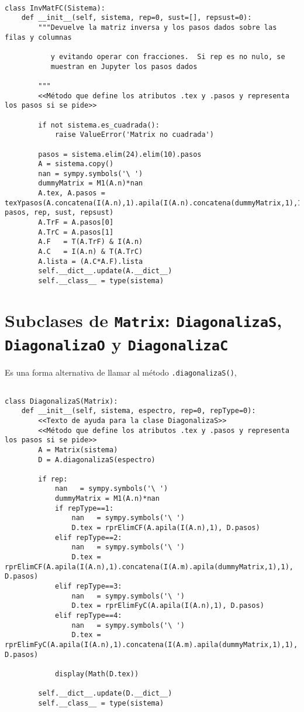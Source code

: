 \documentclass[11pt]{report}
\begin{document}
\begin{verbatim}

class InvMatFC(Sistema):
    def __init__(self, sistema, rep=0, sust=[], repsust=0):
        """Devuelve la matriz inversa y los pasos dados sobre las filas y columnas

           y evitando operar con fracciones.  Si rep es no nulo, se
           muestran en Jupyter los pasos dados

        """
        <<Método que define los atributos .tex y .pasos y representa los pasos si se pide>>

        if not sistema.es_cuadrada():
            raise ValueError('Matrix no cuadrada')
    
        pasos = sistema.elim(24).elim(10).pasos
        A = sistema.copy()
        nan = sympy.symbols('\ ')
        dummyMatrix = M1(A.n)*nan
        A.tex, A.pasos = texYpasos(A.concatena(I(A.n),1).apila(I(A.n).concatena(dummyMatrix,1),1), pasos, rep, sust, repsust)
        A.TrF = A.pasos[0]
        A.TrC = A.pasos[1]
        A.F   = T(A.TrF) & I(A.n)
        A.C   = I(A.n) & T(A.TrC)
        A.lista = (A.C*A.F).lista
        self.__dict__.update(A.__dict__)
        self.__class__ = type(sistema)

\end{verbatim}

\section{Subclases de \texttt{Matrix}: \texttt{DiagonalizaS}, \texttt{DiagonalizaO} y  \texttt{DiagonalizaC}}
\label{sec:orge4fca0e}
Es una forma alternativa de llamar al método \texttt{.diagonalizaS()},
\begin{verbatim}

class DiagonalizaS(Matrix):
    def __init__(self, sistema, espectro, rep=0, repType=0):
        <<Texto de ayuda para la clase DiagonalizaS>>
        <<Método que define los atributos .tex y .pasos y representa los pasos si se pide>>
        A = Matrix(sistema)
        D = A.diagonalizaS(espectro)
        
        if rep:
            nan   = sympy.symbols('\ ')
            dummyMatrix = M1(A.n)*nan
            if repType==1:
                nan   = sympy.symbols('\ ')
                D.tex = rprElimCF(A.apila(I(A.n),1), D.pasos)
            elif repType==2:
                nan   = sympy.symbols('\ ')
                D.tex = rprElimCF(A.apila(I(A.n),1).concatena(I(A.m).apila(dummyMatrix,1),1), D.pasos)
            elif repType==3:
                nan   = sympy.symbols('\ ')
                D.tex = rprElimFyC(A.apila(I(A.n),1), D.pasos)
            elif repType==4:
                nan   = sympy.symbols('\ ')
                D.tex = rprElimFyC(A.apila(I(A.n),1).concatena(I(A.m).apila(dummyMatrix,1),1), D.pasos)
                
            display(Math(D.tex))
            
        self.__dict__.update(D.__dict__)
        self.__class__ = type(sistema)

\end{verbatim}
\end{document}
